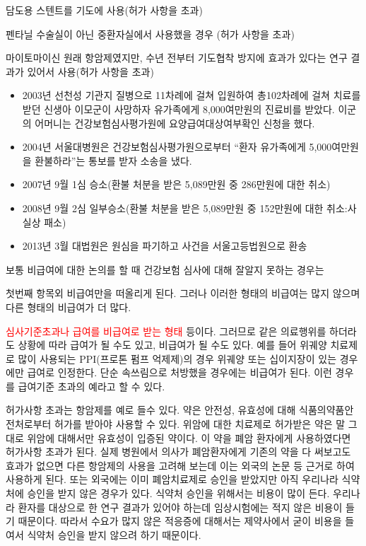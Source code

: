 담도용 스텐트를 기도에 사용(허가 사항을 초과)\par
펜타닐 수술실이 아닌 중환자실에서 사용했을 경우 (허가 사항을 초과) \par
마이토마이신 원래 항암제였지만, 수년 전부터 기도협착 방지에 효과가 있다는 연구 결과가 있어서 사용(허가 사항을 초과)\par

\begin{itemize}\tightlist
\item 2003년 선천성 기관지 질병으로 11차례에 걸쳐 입원하여 총102차례에 걸쳐 치료를 받던 신생아 이모군이 사망하자 유가족에게 8,000여만원의 진료비를 받았다.
이군의 어머니는 건강보험심사평가원에 요양급여대상여부확인 신청을 했다. 
\item 2004년 서울대병원은 건강보험심사평가원으로부터 “환자 유가족에게 5,000여만원을 환불하라”는 통보를 받자 소송을 냈다.
\item 2007년 9월 1심 승소(환불 처분을 받은 5,089만원 중 286만원에 대한 취소)
\item 2008년 9월 2심 일부승소(환불 처분을 받은 5,089만원 중 152만원에 대한 취소:사실상 패소)
\item 2013년 3월 대법원은 원심을 파기하고 사건을 서울고등법원으로 환송
\end{itemize}

보통 비급여에 대한 논의를 할 때 건강보험 심사에 대해 잘알지 못하는 경우는 \par
첫번째 항목외 비급여만을 떠올리게 된다. 그러나 이러한 형태의 비급여는 많지 않으며 다른 형태의 비급여가 더 많다. \par

\textcolor{red}{심사기준초과나 급여를 비급여로 받는 형태} 등이다. 그러므로 같은 의료행위를 하더라도 상황에 따라 급여가 될 수도 있고, 비급여가 될 수도 있다. 예를 들어 위궤양 치료제로 많이 사용되는 PPI(프로톤 펌프 억제제)의 경우
위궤양 또는 십이지장이 있는 경우에만 급여로 인정한다. 단순 속쓰림으로 처방했을 경우에는 비급여가 된다. 이런 경우를 급여기준 초과의 예라고 할 수 있다.

허가사항 초과는 항암제를 예로 들수 있다. 약은 안전성, 유효성에 대해 식품의약품안전처로부터 허가를 받아야 사용할 수 있다. 위암에 대한 치료제로 허가받은 약은 말 그대로 위암에 대해서만 유효성이 입증된 약이다. 이 약을 폐암 환자에게 사용하였다면 허가사항 초과가 된다. 실제 병원에서 의사가 폐암환자에게 기존의 약을 다 써보고도 효과가 없으면 다른 항암제의 사용을 고려해 보는데 이는 외국의 논문 등 근거로 하여 사용하게 된다. 또는 외국에는 이미 폐암치료제로 승인을 받았지만 아직 우리나라 식약처에 승인을 받지 않은 경우가 있다. 식약처 승인을 위해서는 비용이 많이 든다. 우리나라 환자를 대상으로 한 연구 결과가 있어야 하는데 임상시험에는 적지 않은 비용이 들기 때문이다. 따라서 수요가 많지 않은 적응증에 대해서는 제약사에서 굳이 비용을 들여서 식약처 승인을 받지 않으려 하기 때문이다.

